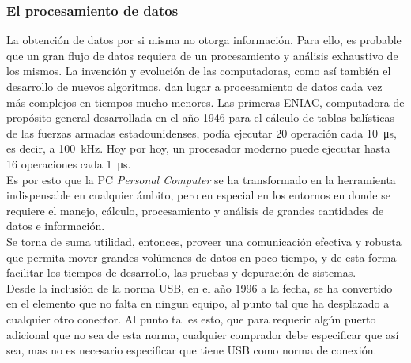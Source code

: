 
\subsubsection*{El procesamiento de datos}
La obtención de datos por si misma no otorga información. Para ello, es probable que un gran flujo de datos requiera de un procesamiento y análisis exhaustivo de los mismos. La invención y evolución de las computadoras, como así también el desarrollo de nuevos algoritmos, dan lugar a procesamiento de datos cada vez más complejos en tiempos mucho menores. Las primeras ENIAC, computadora de propósito general desarrollada en el año 1946 para el cálculo de tablas balísticas de las fuerzas armadas estadounidenses, podía ejecutar 20 operación cada \SI{10}{\micro\second}, es decir, a \SI{100}{\kilo\hertz}. Hoy por hoy, un procesador moderno puede ejecutar hasta 16 operaciones cada \SI{1}{\micro\second}.\\


Es por esto que la PC {\it Personal Computer} se ha transformado en la herramienta indispensable en cualquier ámbito, pero en especial en los entornos en donde se requiere el  manejo, cálculo, procesamiento y análisis de grandes cantidades de datos e información.\\

Se torna de suma utilidad, entonces, proveer una comunicación efectiva y robusta que permita mover grandes volúmenes de datos en poco tiempo, y de esta forma facilitar los tiempos de desarrollo, las pruebas y depuración de sistemas.\\

Desde la inclusión de la norma USB, en el año 1996 a la fecha, se ha convertido en el elemento que no falta en ningun equipo, al punto tal que ha desplazado a cualquier otro conector. Al punto tal es esto, que para requerir algún puerto adicional que no sea de esta norma, cualquier comprador debe especificar que así sea, mas no es necesario especificar que tiene USB como norma de conexión.\\

